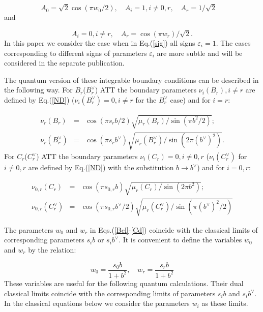\documentclass[a4paper,12pt,titlepage,final]{article}
\begin{document}
\begin{equation}
A_{0}=\sqrt{2}\cos (\pi w_{0}/2),\quad A_{i}=1,i\neq 0,r,\quad A_{r}=
1/\sqrt{2}\quad  \label{BC1}
\end{equation}
and

\begin{equation}
A_{i}=0,i\neq r,\quad A_{r}=\cos (\pi w_{r})/\sqrt{2}.  \label{BC2}
\end{equation}
In this paper we consider the case when in Eq.(\ref{sig}) all signs
$\varepsilon _{i}=1$. The cases corresponding to different signs of
parameters $\varepsilon _{i}$ are more subtle and will be considered in the
separate publication.

The quantum version of these integrable boundary conditions can be described
in the following way. For $B_{r}$($B_{r}^{\vee }$) ATT the boundary
parameters $\nu _{i}(B_{r}),i\neq r$ are defined by Eq.(\ref{ND})
($\nu_{i}(B_{r}^{\vee })=0,i\neq r$
for the $B_{r}^{\vee }$ case) and for $i=r$:

\begin{eqnarray}
\nu _{r}(B_{r}) &=&\cos (\pi s_{r}b/2)\sqrt{\mu _{r}(B_{r})/\sin (\pi
b^{2}/2)};  \nonumber \\
\nu _{r}(B_{r}^{\vee }) &=&\cos (\pi s_{r}b^{\vee })\sqrt{\mu
_{r}(B_{r}^{\vee })/\sin (2\pi (b^{\vee })^{2})}.  \label{BQT}
\end{eqnarray}
For $C_{r}$($C_{r}^{\vee }$) ATT the boundary parameters $\nu
_{i}(C_{r})=0,i\neq 0,r$ ($\nu _{i}(C_{r}^{\vee })$ for $i\neq 0,r$ are
defined by Eq.(\ref{ND}) with the substitution $b\rightarrow b^{\vee }$) and
for $i=0,r$:

\begin{eqnarray}
\nu _{0,r}(C_{r}) &=&\cos (\pi s_{0,r}b)\sqrt{\mu _{r}(C_{r})/\sin (2\pi
b^{2})};  \nonumber \\
\nu _{0,r}(C_{r}^{\vee }) &=&\cos (\pi s_{0,r}b^{\vee }/2)\sqrt{\mu
_{r}(C_{r}^{\vee })/\sin (\pi (b^{\vee })^{2}/2)}  \label{CQT}
\end{eqnarray}

The parameters $w_{0}$ and $w_{r}$ in Eqs.(\ref{Bcl}-\ref{Cd}) coincide with
the classical limits of corresponding parameters $s_{i}b$ or
$s_{i}b^{\vee }$.
It is convenient to define the variables $w_{0}$ and $w_{r}$ by the
relation:

\begin{equation}
w_{0}=\frac{s_{0}b}{1+b^{2}},\quad w_{r}=\frac{s_{r}b}{1+b^{2}}  \label{w}
\end{equation}
These variables are useful for the following quantum calculations. Their
dual classical limits coincide with the corresponding limits of parameters
$s_{i}b$ and $s_{i}b^{\vee }$. In the classical equations below we
consider the parameters $w_{i}$ as these limits.
\end{document}
